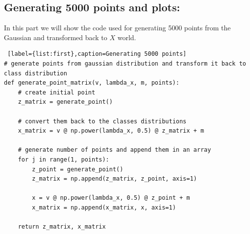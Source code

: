 \documentclass[11pt, oneside]{article}   	%
\begin{document}
\subsection{Generating 5000 points and plots:}
In this part we will show the code used for generating 5000 points from the Gaussian and transformed back to $X$ world.
\begin{lstlisting} [label={list:first},caption=Generating 5000 points]
# generate points from gaussian distribution and transform it back to class distribution
def generate_point_matrix(v, lambda_x, m, points):
    # create initial point
    z_matrix = generate_point()

    # convert them back to the classes distributions
    x_matrix = v @ np.power(lambda_x, 0.5) @ z_matrix + m

    # generate number of points and append them in an array
    for j in range(1, points):
        z_point = generate_point()
        z_matrix = np.append(z_matrix, z_point, axis=1)

        x = v @ np.power(lambda_x, 0.5) @ z_point + m
        x_matrix = np.append(x_matrix, x, axis=1)

    return z_matrix, x_matrix

\end{lstlisting}
\end{document}
